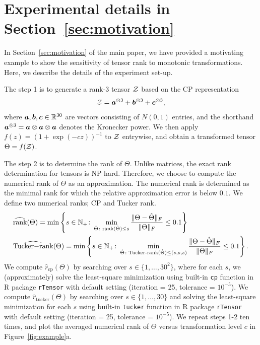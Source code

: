 \documentclass[twoside,11pt]{article}
\theoremstyle{definition}
\def\rank{\textup{rank}}
\begin{document}
\section{Experimental details in Section~\ref{sec:motivation}}\label{sec:numericalrank}
In Section~\ref{sec:motivation} of the main paper, we have provided a motivating example to show the sensitivity of tensor rank to monotonic transformations. Here, we describe the details of the experiment set-up. 

The step 1 is to generate a rank-3 tensor $\mathcal{Z}$ based on the CP representation
\[
\mathcal{Z}=\bm{a}^{\otimes 3}+\bm{b}^{\otimes 3}+\bm{c}^{\otimes 3},
\]
where $\bm{a},\bm{b},\bm{c}\in\mathbb{R}^{30}$ are vectors consisting of $N(0,1)$ entries, and the shorthand $\bm{a}^{\otimes 3}=\bm{a}\otimes \bm{a}\otimes \bm{a}$ denotes the Kronecker power. We then apply $f(z)=(1+\exp(-cz))^{-1}$ to $\mathcal{Z}$ entrywise, and obtain a transformed tensor $\Theta=f(\mathcal{Z})$. 

The step 2 is to determine the rank of $\Theta$. Unlike matrices, the exact rank determination for tensors is NP hard. Therefore, we choose to compute the numerical rank of $\Theta$ as an approximation.  The numerical rank is determined as the minimal rank for which the relative approximation error is below $0.1$. We define two numerical ranks; CP and Tucker rank.
\begin{align}\label{eq:numeric}
& \widehat{\rank}(\Theta)=\min\left\{s\in\mathbb{N}_{+}\colon \min_{\hat \Theta\colon \rank(\hat \Theta)\leq s}{\FnormSize{}{\Theta-\hat \Theta}\over \FnormSize{}{\Theta}} \leq 0.1\right\}\\
& \widehat{\text{Tucker$-$rank}}(\Theta)=\min\left\{s\in\mathbb{N}_{+}\colon \min_{\hat \Theta\colon \text{Tucker-rank}(\hat \Theta)\leq (s,s,s)}{\FnormSize{}{\Theta-\hat \Theta}\over \FnormSize{}{\Theta}} \leq 0.1\right\}.
\end{align}
We compute $\hat r_{\text{cp}}(\Theta)$ by searching over $s\in\{1,\ldots,30^2\}$, where for each $s$, we (approximately) solve the least-square minimization using built-in \texttt{cp} function in R package {\tt rTensor} with default setting (iteration = 25, tolerance = $10^{-5}$). 
We compute $\hat r_{\text{tucker}}(\Theta)$ by searching over $s\in\{1,\ldots,30\}$ and solving the least-square minimization for each $s$ using built-in \texttt{tucker} function in R package {\tt rTensor} with default setting (iteration = 25, tolerance = $10^{-5}$). 
We repeat steps 1-2 ten times, and plot the averaged numerical rank of $\Theta$ versus transformation level $c$ in Figure~\ref{fig:example}a.  
\end{document}
